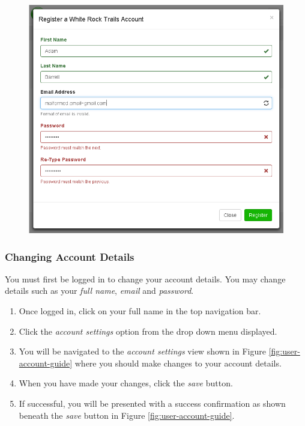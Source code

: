 \documentclass[11pt,a4paper]{report}
\begin{document}
\begin{figure}[H]
\centering
\includegraphics[width=0.6\linewidth]{./img/webportal/registration}
\caption{}
\label{fig:registration-guide}
\end{figure}


\subsubsection{Changing Account Details}

You must first be logged in to change your account details. You may change details such as your \emph{full name}, \emph{email} and \emph{password}.

\begin{enumerate}
\item Once logged in, click on your full name in the top navigation bar.
\item Click the \emph{account settings} option from the drop down menu displayed.
\item You will be navigated to the \emph{account settings} view shown in Figure \ref{fig:user-account-guide} where you should make changes to your account details.
\item When you have made your changes, click the \emph{save} button.
\item If successful, you will be presented with a success confirmation as shown beneath the \emph{save} button in Figure \ref{fig:user-account-guide}.
\end{enumerate}
\end{document}
